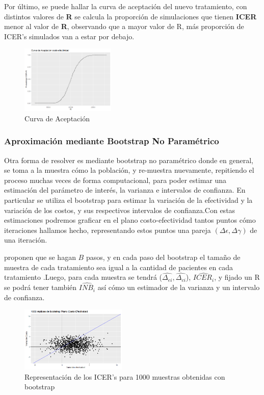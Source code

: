 \documentclass{siep}
\begin{document}
Por último, se  puede hallar la curva de aceptación del nuevo tratamiento, con distintos valores de \textbf{R} se calcula la proporción de simulaciones que tienen \textbf{ICER} menor al valor de \textbf{R}, observando que a mayor valor de R, más proporción de ICER's simulados van a estar por debajo.\\

\begin{figure}[htbp]
	\centering
	\includegraphics[width=0.4\textwidth]{grafi/curva_acept.png}
	\caption{Curva de Aceptación}
	\label{fig:4}
\end{figure}

\subsubsection{Aproximación mediante Bootstrap No Param\'etrico}
\label{sec:AMBNP}
Otra forma de resolver es mediante bootstrap no param\'etrico donde en general, se toma a la muestra cómo la población, y re-muestra nuevamente, repitiendo el proceso muchas veces de forma computacional, para poder estimar una estimación del parámetro de interés, la varianza e intervalos de confianza. En particular se utiliza el bootstrap para estimar la variación de la efectividad y la variación de los costos, y sus respectivos intervalos de confianza.Con estas estimaciones podremos graficar en el plano costo-efectividad tantos puntos cómo iteraciones hallamos hecho, representando estos puntos una pareja $(\Delta\epsilon,\Delta\gamma)$ de una iteración.


\cite{willan_statistical_2006} proponen que se hagan $B$ pasos, y en cada paso del bootstrap el tamaño de muestra de cada tratamiento sea igual a la cantidad de pacientes en cada tratamiento .Luego, para cada muestra se tendr\'a ($\hat{\Delta_{ei}},\hat{\Delta_{ci}}$), $\widehat{ICER_{i}}$, y fijado un R se podr\'a tener también $\widehat{INB_i}$ así cómo un estimador de la varianza y un intervalo de confianza.

\begin{figure}[htbp]
	\centering
	\includegraphics[width=0.45\textwidth]{grafi/boostrap.jpg}
	\caption{Representación de los ICER's para 1000 muestras obtenidas con bootstrap}
	\label{fig:5}
\end{figure}
\end{document}
